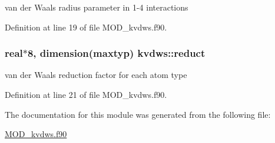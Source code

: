 van der Waals radius parameter in 1-\/4 interactions 



Definition at line 19 of file M\-O\-D\-\_\-kvdws.\-f90.

\hypertarget{classkvdws_ab8384b54fc7099480240100d4c8dea06}{
\subsubsection[{reduct}]{\setlength{\rightskip}{0pt plus 5cm}real$\ast$8, dimension(maxtyp) kvdws\-::reduct}}\label{classkvdws_ab8384b54fc7099480240100d4c8dea06}


van der Waals reduction factor for each atom type 



Definition at line 21 of file M\-O\-D\-\_\-kvdws.\-f90.



The documentation for this module was generated from the following file\-:\begin{DoxyCompactItemize}
\item 
\hyperlink{MOD__kvdws_8f90}{M\-O\-D\-\_\-kvdws.\-f90}\end{DoxyCompactItemize}
